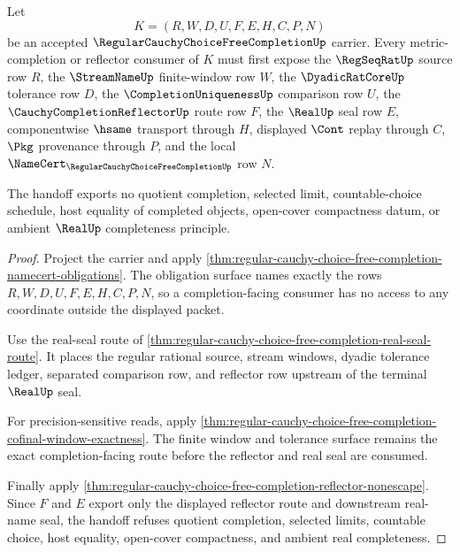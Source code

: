 \begin{theorem}
\label{thm:regular-cauchy-choice-free-completion-metric-reflector-handoff}
Let
$$
K=(R,W,D,U,F,E,H,C,P,N)
$$
be an accepted $\RegularCauchyChoiceFreeCompletionUp$ carrier. Every metric-completion or reflector consumer of $K$ must first expose the $\RegSeqRatUp$ source row $R$, the $\StreamNameUp$ finite-window row $W$, the $\DyadicRatCoreUp$ tolerance row $D$, the $\CompletionUniquenessUp$ comparison row $U$, the $\CauchyCompletionReflectorUp$ route row $F$, the $\RealUp$ seal row $E$, componentwise $\hsame$ transport through $H$, displayed $\Cont$ replay through $C$, $\Pkg$ provenance through $P$, and the local $\NameCert_{\RegularCauchyChoiceFreeCompletionUp}$ row $N$.

The handoff exports no quotient completion, selected limit, countable-choice schedule, host equality of completed objects, open-cover compactness datum, or ambient $\RealUp$ completeness principle.
\end{theorem}
\begin{proof}
Project the carrier and apply \autoref{thm:regular-cauchy-choice-free-completion-namecert-obligations}. The obligation surface names exactly the rows $R,W,D,U,F,E,H,C,P,N$, so a completion-facing consumer has no access to any coordinate outside the displayed packet.

Use the real-seal route of \autoref{thm:regular-cauchy-choice-free-completion-real-seal-route}. It places the regular rational source, stream windows, dyadic tolerance ledger, separated comparison row, and reflector row upstream of the terminal $\RealUp$ seal.

For precision-sensitive reads, apply \autoref{thm:regular-cauchy-choice-free-completion-cofinal-window-exactness}. The finite window and tolerance surface remains the exact completion-facing route before the reflector and real seal are consumed.

Finally apply \autoref{thm:regular-cauchy-choice-free-completion-reflector-nonescape}. Since $F$ and $E$ export only the displayed reflector route and downstream real-name seal, the handoff refuses quotient completion, selected limits, countable choice, host equality, open-cover compactness, and ambient real completeness.
\end{proof}

